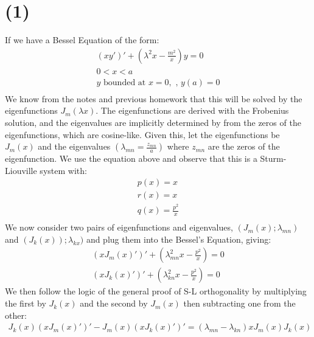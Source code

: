 \documentclass{article}
\begin{document}
\section*{\textbf{(1)}}
If we have a Bessel Equation of the form:
\begin{equation}
\begin{aligned}
(xy')' + (\lambda^2x - \frac{m^2}{x})y = 0\\
0 < x < a\\
y \text{ bounded at } x = 0, \text{ , } y(a) = 0\\
\end{aligned}
\end{equation}
We know from the notes and previous homework that this will be solved by the eigenfunctions $J_m(\lambda x)$. The eigenfunctions are derived with the Frobenius solution, and the eigenvalues are implicitly determined by from the zeros of the eigenfunctions, which are cosine-like. Given this, let the eigenfunctions be $J_m(x)$ and the eigenvalues $(\lambda_{mn} = \frac{z_{mn}}{a})$ where $z_{mn}$ are the zeros of the eigenfunction. We use the equation above and observe that this is a Sturm-Liouville  system with:
\begin{equation}
\begin{aligned}
p(x) = x\\
r(x) = x\\
q(x) = \frac{p^2}{x}\\
\end{aligned}
\end{equation}
We now consider two pairs of eigenfunctions and eigenvalues, $(J_m(x);\lambda_{mn})$ and $(J_k(x)); \lambda_{kx})$ and plug them into the Bessel's Equation, giving:
\begin{equation}
\begin{aligned}
(xJ_m(x)')' + (\lambda_{mn}^2x - \frac{p^2}{x}) = 0\\
(xJ_k(x)')' + (\lambda_{kn}^2x - \frac{p^2}{x}) = 0
\end{aligned}
\end{equation}
We then follow the logic of the general proof of S-L orthogonality by multiplying the first by $J_k(x)$ and the second by $J_m(x)$ then subtracting one from the other:
\begin{equation}
\begin{aligned}
J_k(x) (xJ_m(x)')' - J_m(x)(xJ_k(x)')' = (\lambda_{mn} - \lambda_{kn})xJ_m(x)J_k(x)\\
\end{aligned}
\end{equation}
\end{document}
